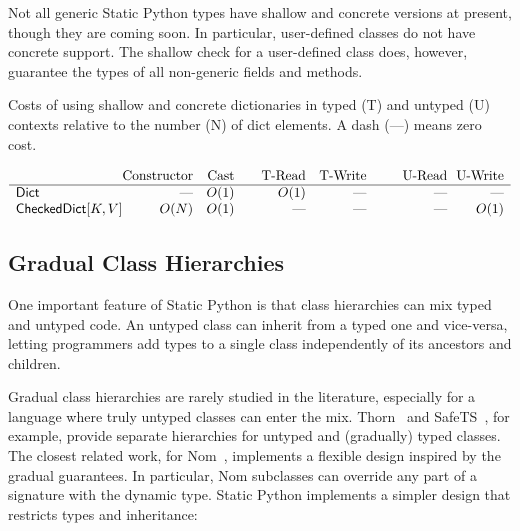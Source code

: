 \documentclass[english,cleveref,submission]{programming}
\newcommand{\SP}{Static Python}
\newcommand{\typefont}[1]{\mathsf{#1}}
\newcommand{\paramtype}[2]{#1[#2]}
\newcommand{\sptrawpydict}{\typefont{Dict}}
\newcommand{\sptrawchkdict}{\typefont{CheckedDict}} %
\newcommand{\sptchkdict}[2]{\paramtype{\sptrawchkdict}{#1, #2}}
\begin{document}
Not all generic \SP{} types have shallow and concrete versions at present,
though they are coming soon.
In particular, user-defined classes do not have concrete support.
The shallow check for a user-defined class does, however, guarantee the types
of all non-generic fields and methods.

\begin{table}[t]
  \newcommand{\nocost}{\textrm{---}}
  \caption{Costs of using shallow and concrete dictionaries in typed (T) and untyped (U) contexts relative to the number (N) of dict elements. A dash (\nocost{}) means zero cost.}
  \label{t:shallow-vs-concrete}

  \centering
  \(\begin{array}{l@{}rr@{\qquad}rr@{~~}@{\qquad}r@{~~}r}
                   & \mbox{Constructor} & \mbox{Cast} & \mbox{T-Read} & \mbox{T-Write} & \mbox{U-Read} & \mbox{U-Write} \\\hline
    \sptrawpydict         &   \nocost{} &        O(1) &          O(1) &      \nocost{} &     \nocost{} &      \nocost{} \\
    \sptchkdict{K}{V}     &        O(N) &        O(1) &     \nocost{} &      \nocost{} &     \nocost{} &           O(1)
  \end{array}\)
\end{table}



\subsection{Gradual Class Hierarchies}
\label{s:inheritance}

One important feature of \SP{} is that class hierarchies can
mix typed and untyped code.
An untyped class can inherit from a typed one and vice-versa,
letting programmers add types to a single class independently of its ancestors
and children.


Gradual class hierarchies are rarely studied in the literature, especially
for a language where truly untyped classes can enter the mix.
Thorn~\cite{wzlov-popl-2010} and SafeTS~\cite{rsfbv-popl-2015}, for example,
provide separate hierarchies for untyped and (gradually) typed classes.
The closest related work, for Nom~\cite{mt-oopsla-2017}, implements
a flexible design inspired by the gradual guarantees.
In particular, Nom subclasses can override any part of a signature with the
dynamic type.
\SP{} implements a simpler design that restricts types and
inheritance:
\end{document}
